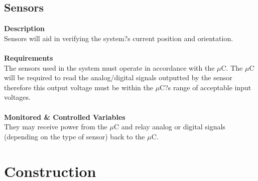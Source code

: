 \documentclass[titlepage]{article}
\begin{document}
\subsection{Sensors}
\textbf{Description}\\
Sensors will aid in verifying the system?s current position and orientation.\\\\
\textbf{Requirements}\\
The sensors used in the system must operate in accordance with the $\mu$C. The $\mu$C will be required to read the analog/digital signals outputted by the sensor therefore this output voltage must be within the $\mu$C?s range of acceptable input voltages.\\\\
\textbf{Monitored \& Controlled Variables}\\
They may receive power from the $\mu$C and relay analog or digital signals (depending on the type of sensor) back to the $\mu$C.



\section{Construction}
\end{document}
